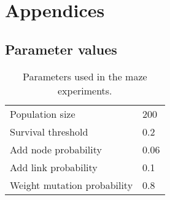 \section*{Appendices}

\subsection*{Parameter values}
\begin{table}[H]
    \centering
    \begin{tabular}{ll}
    \toprule
    Population size & 200\\
    Survival threshold & 0.2\\
    Add node probability &  0.06\\
    Add link probability &  0.1\\
    Weight mutation probability &  0.8\\
    \bottomrule
    \end{tabular}
    \caption{Parameters used in the maze experiments.}
\end{table}

